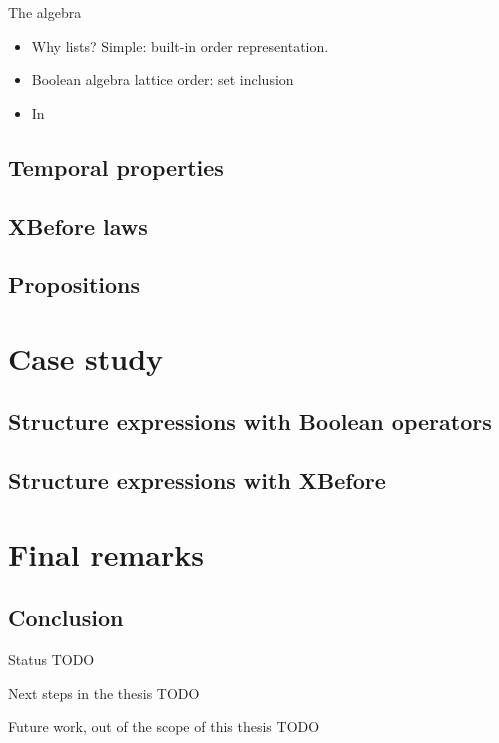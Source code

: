 \documentclass{beamer}
\begin{document}
\begin{frame}{The algebra}
	\begin{itemize}
		\item Why lists? Simple: built-in order representation.
		\item Boolean algebra lattice order: set inclusion
		\item In 
	\end{itemize}
\end{frame}

\subsection{Temporal properties}
\subsection{XBefore laws}
\subsection{Propositions}

\section{Case study}
\subsection{Structure expressions with Boolean operators}
\subsection{Structure expressions with XBefore}

\section{Final remarks}
\subsection{Conclusion}

\begin{frame}{Status}
TODO
\end{frame}

\begin{frame}{Next steps in the thesis}
TODO
\end{frame}

\begin{frame}{Future work, out of the scope of this thesis}
TODO
\end{frame}

\end{document}
